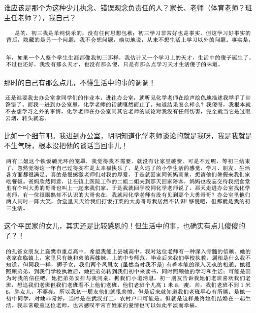 \documentclass[9pt, b5paper]{article}
\begin{document}
谁应该是那个为这种少儿执念、错误观念负责任的人？家长、老师（体育老师？班主任老师？），我自己？

\begin{center}
\includegraphics[width=.9\linewidth]{./pic/backups_plans_20210422_102437.png}
\end{center}

\begin{center}
\includegraphics[width=.9\linewidth]{./pic/backups_plans_20210422_102457.png}
\end{center}

那时的自己有那么点儿，不懂生活中的事的调调！

\begin{center}
\includegraphics[width=.9\linewidth]{./pic/backups_plans_20210422_102534.png}
\end{center}

比如一个细节吧。我进到办公室，明明知道化学老师谈论的就是我呀，我是我就是不生气呀，根本没把他的谈话当回事儿！

\begin{center}
\includegraphics[width=.9\linewidth]{./pic/backups_plans_20210422_171112.png}
\end{center}

这个平民家的女儿，其实还是比较感恩的！但生活中的事，也确实有点儿傻傻的了？！

\begin{center}
\includegraphics[width=.9\linewidth]{./pic/backups_plans_20210422_102629.png}
\end{center}
\end{document}
